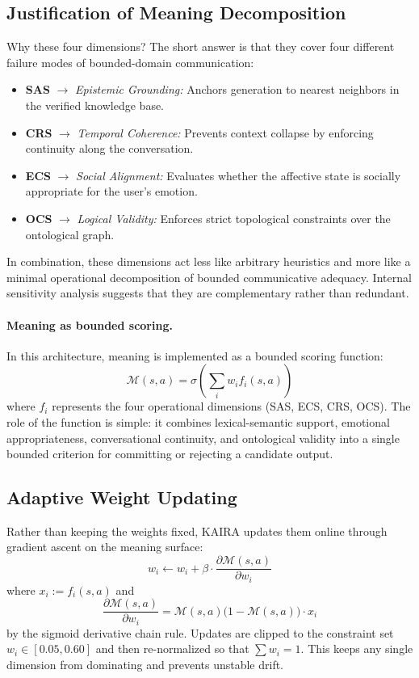 \documentclass[11pt,a4paper]{article}
\begin{document}
\subsection{Justification of Meaning Decomposition}
Why these four dimensions? The short answer is that they cover four different failure modes of bounded-domain communication:
\begin{itemize}
  \item \textbf{SAS} $\rightarrow$ \textit{Epistemic Grounding:} Anchors generation to nearest neighbors in the verified knowledge base.
  \item \textbf{CRS} $\rightarrow$ \textit{Temporal Coherence:} Prevents context collapse by enforcing continuity along the conversation.
  \item \textbf{ECS} $\rightarrow$ \textit{Social Alignment:} Evaluates whether the affective state is socially appropriate for the user's emotion.
  \item \textbf{OCS} $\rightarrow$ \textit{Logical Validity:} Enforces strict topological constraints over the ontological graph.
\end{itemize}
In combination, these dimensions act less like arbitrary heuristics and more like a minimal operational decomposition of bounded communicative adequacy. Internal sensitivity analysis suggests that they are complementary rather than redundant.

\paragraph{Meaning as bounded scoring.}
In this architecture, meaning is implemented as a bounded scoring function:
\begin{equation}
  \mathcal{M}(s,a) = \sigma \left( \sum_i w_i f_i(s,a) \right)
  \label{eq:meaning}
\end{equation}
where $f_i$ represents the four operational dimensions (SAS, ECS, CRS, OCS). The role of the function is simple: it combines lexical-semantic support, emotional appropriateness, conversational continuity, and ontological validity into a single bounded criterion for committing or rejecting a candidate output.

\subsection{Adaptive Weight Updating}

Rather than keeping the weights fixed, KAIRA updates them online through gradient ascent on the meaning surface:
\begin{equation}
  w_i \leftarrow w_i + \beta \cdot \frac{\partial \mathcal{M}(s,a)}{\partial w_i}
  \label{eq:meta}
\end{equation}
where $x_i := f_i(s,a)$ and
\[
\frac{\partial \mathcal{M}(s,a)}{\partial w_i} = \mathcal{M}(s,a)\bigl(1-\mathcal{M}(s,a)\bigr)\cdot x_i
\]
by the sigmoid derivative chain rule. Updates are clipped to the constraint set $w_i \in [0.05, 0.60]$ and then re-normalized so that $\sum w_i = 1$. This keeps any single dimension from dominating and prevents unstable drift.
\end{document}
